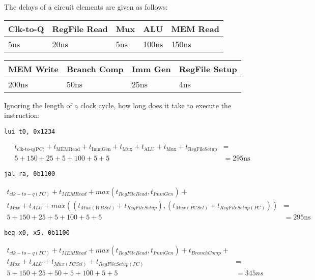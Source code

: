 \begin{blocksection}
The delays of a circuit elements are given as follows:

\begin{tabular}{ |l|l|l|l|l| } 
	\hline
	Clk-to-Q & RegFile Read & Mux & ALU & MEM Read \\ 
	\hline
	5ns & 20ns & 5ns & 100ns & 150ns \\ 
	\hline
\end{tabular}

\begin{tabular}{ |l|l|l|l| } 
	\hline
	MEM Write & Branch Comp & Imm Gen & RegFile Setup \\ 
	\hline
	200ns & 50ns & 25ns & 4ns \\ 
	\hline
\end{tabular}

\question
Ignoring the length of a clock cycle, how long does it take to execute the instruction:

\begin{parts}

	\item
	\lstinline$lui t0, 0x1234$
	\begin{solution}[0.3in]
		\begin{align*}
		t_{\text{clk-to-q(PC)}} + t_{\text{MEMRead}} + t_{\text{ImmGen}} + t_{\text{Mux}} + t_{\text{ALU}} + t_{\text{Mux}} + t_{\text{RegFileSetup}} &=\\
		5 + 150 + 25 + 5 + 100 + 5 + 5 &= 295\text{ns}
		\end{align*}
	\end{solution}

	\item
	\lstinline$jal ra, 0b1100$
	\begin{solution}[0.3in]
		\begin{align*}
		t_{clk-to-q(PC)} + t_{MEMRead} + max(t_{RegFileRead}, t_{ImmGen}) +\\
		 t_{Mux} + t_{ALU} + max((t_{Mux(WBSel)} + t_{RegFileSetup}), (t_{Mux(PCSel)} + t_{RegFileSetup(PC)})) &=\\
		5 + 150 + 25 + 5 + 100 + 5 + 5 &= 295\text{ns}
		\end{align*}
	\end{solution}


	\item
	\lstinline$beq x0, x5, 0b1100$
	\begin{solution}[0.5in]
		\begin{align*}
		t_{clk-to-q(PC)} + t_{MEMRead} + max(t_{RegFileRead}, t_{ImmGen}) + t_{BranchComp} +\\
		 t_{Mux} + t_{ALU} + t_{Mux(PCSel)} + t_{RegFileSetup(PC)} &=\\
		5 + 150 + 25 + 50 + 5 + 100 + 5 + 5 &= 345ns
		\end{align*}
	\end{solution}

\end{parts}
\end{blocksection}
